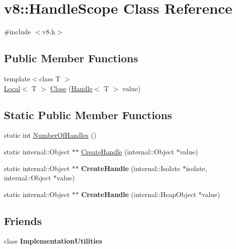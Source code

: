 \hypertarget{classv8_1_1_handle_scope}{}\section{v8\+:\+:Handle\+Scope Class Reference}
\label{classv8_1_1_handle_scope}


{\ttfamily \#include $<$v8.\+h$>$}

\subsection*{Public Member Functions}
\begin{DoxyCompactItemize}
\item 
{\footnotesize template$<$class T $>$ }\\\hyperlink{classv8_1_1_local}{Local}$<$ T $>$ \hyperlink{classv8_1_1_handle_scope_af18b68b6b149e69a05873a20c6fa269c}{Close} (\hyperlink{classv8_1_1_handle}{Handle}$<$ T $>$ value)
\end{DoxyCompactItemize}
\subsection*{Static Public Member Functions}
\begin{DoxyCompactItemize}
\item 
static int \hyperlink{classv8_1_1_handle_scope_abb2d32a75b0468885b7340404050604b}{Number\+Of\+Handles} ()
\item 
static internal\+::\+Object $\ast$$\ast$ \hyperlink{classv8_1_1_handle_scope_a93131ee7939a9bc52a62a1f370882906}{Create\+Handle} (internal\+::\+Object $\ast$value)
\item 
\hypertarget{classv8_1_1_handle_scope_a3f63aa8552a0371606305f58187d80e2}{}static internal\+::\+Object $\ast$$\ast$ {\bfseries Create\+Handle} (internal\+::\+Isolate $\ast$isolate, internal\+::\+Object $\ast$value)\label{classv8_1_1_handle_scope_a3f63aa8552a0371606305f58187d80e2}

\item 
\hypertarget{classv8_1_1_handle_scope_a3c74ab114761127941531ec4ebb9952b}{}static internal\+::\+Object $\ast$$\ast$ {\bfseries Create\+Handle} (internal\+::\+Heap\+Object $\ast$value)\label{classv8_1_1_handle_scope_a3c74ab114761127941531ec4ebb9952b}

\end{DoxyCompactItemize}
\subsection*{Friends}
\begin{DoxyCompactItemize}
\item 
\hypertarget{classv8_1_1_handle_scope_ac7b520085953e146d849e05253267f72}{}class {\bfseries Implementation\+Utilities}\label{classv8_1_1_handle_scope_ac7b520085953e146d849e05253267f72}

\end{DoxyCompactItemize}


